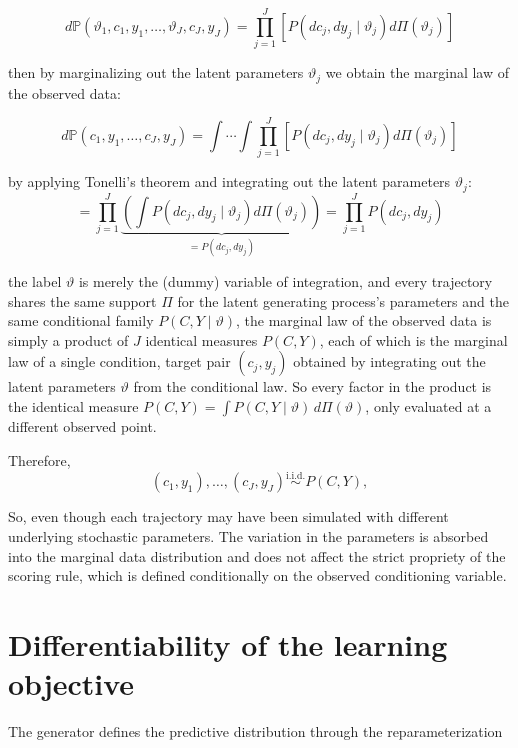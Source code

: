\begin{appendices}
\[
d \mathbb{P}\left(\vartheta_1, c_1, y_1, \ldots, \vartheta_J, c_J, y_J\right)=
\prod_{j=1}^J\left[P\left(d c_j, d y_j \mid \vartheta_j\right) 
d \Pi\left(\vartheta_j\right)\right]
\]

then by marginalizing out the latent parameters $\vartheta_j$ we obtain the marginal law of the observed data:

\[
d \mathbb{P}\left(c_1, y_1, \ldots, c_J, y_J\right)=
\int \cdots \int \prod_{j=1}^J\left[P\left(d c_j, d y_j 
\mid \vartheta_j\right) d \Pi\left(\vartheta_j\right)\right]
\]

by applying Tonelli's theorem and integrating out the latent parameters $\vartheta_j$:
\[
=\prod_{j=1}^J 
\underbrace{\left(\int P\left(d c_j, d y_j \mid 
\vartheta_j\right) d \Pi\left(\vartheta_j\right)\right)}_{=P\left(d c_j, d y_j\right)}=\prod_{j=1}^J 
P\left(d c_j, d y_j\right)
\]


the label $\vartheta$
is merely the (dummy) variable of integration, 
and every trajectory shares the same 
support $\Pi$ for the latent generating process's parameters 
and the same conditional family 
$P(C,Y\mid\vartheta)$,
the marginal law of the observed data is simply a product of $J$ identical measures $P(C,Y)$, each of which is the marginal law of a single condition, target pair $(c_j,y_j)$ obtained by integrating out the latent parameters $\vartheta$ from the conditional law.
So every factor in the product is the identical measure 
$P(C,Y)=
\int
P(C,Y\mid\vartheta)
\,d\Pi(\vartheta)$, only evaluated at a different observed point.

Therefore,
\[
(c_1,y_1),\ldots,(c_J,y_J)
\stackrel{\mathrm{i.i.d.}}{\sim}
P(C,Y),
\]

So, even though each trajectory may have been simulated with different underlying stochastic parameters. The variation in the parameters is absorbed into the marginal data distribution and does not affect the strict propriety of the scoring rule, which is defined conditionally on the observed conditioning variable.




\section{Differentiability of the learning objective}

The generator defines the predictive distribution through the reparameterization


\end{appendices}
